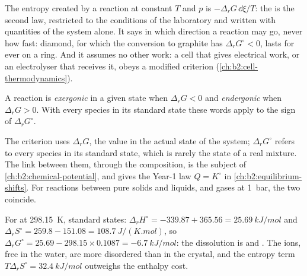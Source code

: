\begin{remark}\label{rem:b2:reaction-free-energy:criterion}
The entropy created by a reaction at constant $T$ and $p$ is $-\Delta_r G\,
\dd\xi/T$: the  is the second law, restricted to the conditions
of the laboratory and written with quantities of the system alone. It says
in which direction a reaction may go, never how fast: diamond, for which
the conversion to graphite has $\Delta_r G^\circ < 0$, lasts for ever on a
ring. And it assumes no other work: a cell that gives electrical work, or an
electrolyser that receives it, obeys a modified criterion
(\cref{ch:b2:cell-thermodynamics}).
\end{remark}

\begin{definition}\label{def:b2:reaction-free-energy:exergonic}
A reaction is \emph{exergonic} in a given state when
$\Delta_r G < 0$ and \emph{endergonic} when $\Delta_r G >
0$. With every species in its standard state these words apply to the sign
of $\Delta_r G^\circ$.
\end{definition}

The criterion uses $\Delta_r G$, the value in the actual state of the
system; $\Delta_r G^\circ$ refers to every species in its standard state,
which is rarely the state of a real mixture. The link between them, through
the composition, is the subject of \cref{ch:b2:chemical-potential}, and
gives the Year-1 law $Q = K^\circ$ in \cref{ch:b2:equilibrium-shifts}. For
reactions between pure solids and liquids, and gases at \qty{1}{bar}, the
two coincide.

\begin{example}\label{ex:b2:reaction-free-energy:cold-pack}
For  at \qty{298.15}{K}, standard
states: $\Delta_r H^\circ = -339.87 + 365.56 = \qty{+25.69}{kJ/mol}$ and
$\Delta_r S^\circ = 259.8 - 151.08 = \qty{+108.7}{J/(K.mol)}$, so
$\Delta_r G^\circ = 25.69 - 298.15 \times 0.1087 = \qty{-6.7}{kJ/mol}$: the
dissolution is  and . The ions, free in the water, are
more disordered than in the crystal, and the entropy term $T\Delta_r
S^\circ = \qty{32.4}{kJ/mol}$ outweighs the enthalpy cost.
\end{example}

